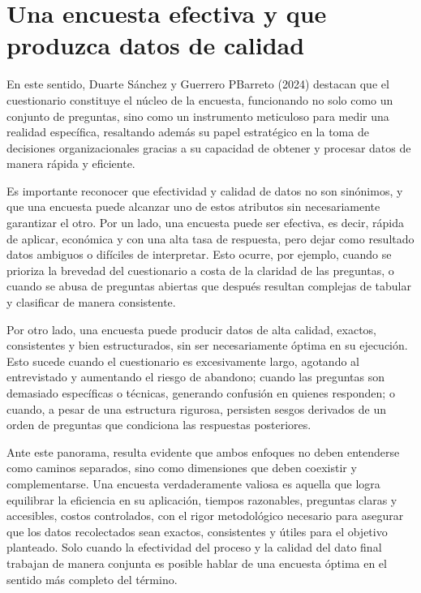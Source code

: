 \documentclass[12pt, letterpaper]{article}
\begin{document}
\section{Una encuesta efectiva y que produzca datos de calidad}

En este sentido, Duarte Sánchez y Guerrero PBarreto (2024) destacan que el cuestionario constituye el núcleo de la encuesta, funcionando no solo como un conjunto de preguntas, sino como un instrumento meticuloso para medir una realidad específica, resaltando además su papel estratégico en la toma de decisiones organizacionales gracias a su capacidad de obtener y procesar datos de manera rápida y eficiente.

Es importante reconocer que efectividad y calidad de datos no son sinónimos, y que una encuesta puede alcanzar uno de estos atributos sin necesariamente garantizar el otro. Por un lado, una encuesta puede ser efectiva, es decir, rápida de aplicar, económica y con una alta tasa de respuesta, pero dejar como resultado datos ambiguos o difíciles de interpretar. Esto ocurre, por ejemplo, cuando se prioriza la brevedad del cuestionario a costa de la claridad de las preguntas, o cuando se abusa de preguntas abiertas que después resultan complejas de tabular y clasificar de manera consistente.

Por otro lado, una encuesta puede producir datos de alta calidad, exactos, consistentes y bien estructurados, sin ser necesariamente óptima en su ejecución. Esto sucede cuando el cuestionario es excesivamente largo, agotando al entrevistado y aumentando el riesgo de abandono; cuando las preguntas son demasiado específicas o técnicas, generando confusión en quienes responden; o cuando, a pesar de una estructura rigurosa, persisten sesgos derivados de un orden de preguntas que condiciona las respuestas posteriores.

Ante este panorama, resulta evidente que ambos enfoques no deben entenderse como caminos separados, sino como dimensiones que deben coexistir y complementarse. Una encuesta verdaderamente valiosa es aquella que logra equilibrar la eficiencia en su aplicación, tiempos razonables, preguntas claras y accesibles, costos controlados, con el rigor metodológico necesario para asegurar que los datos recolectados sean exactos, consistentes y útiles para el objetivo planteado. Solo cuando la efectividad del proceso y la calidad del dato final trabajan de manera conjunta es posible hablar de una encuesta óptima en el sentido más completo del término.
\end{document}
